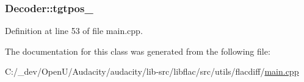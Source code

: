 \subsubsection[{\texorpdfstring{tgtpos\+\_\+}{tgtpos_}}]{ Decoder\+::tgtpos\+\_\+}\hypertarget{class_decoder_ae38b1d7af7b7d4183e08f6d6261e613c}{}\label{class_decoder_ae38b1d7af7b7d4183e08f6d6261e613c}


Definition at line 53 of file main.\+cpp.



The documentation for this class was generated from the following file\+:\begin{DoxyCompactItemize}
\item 
C\+:/\+\_\+dev/\+Open\+U/\+Audacity/audacity/lib-\/src/libflac/src/utils/flacdiff/\hyperlink{lib-src_2libflac_2src_2utils_2flacdiff_2main_8cpp}{main.\+cpp}\end{DoxyCompactItemize}
